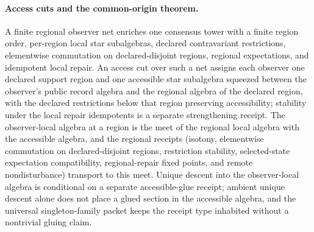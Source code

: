 \documentclass[11pt]{article}
\theoremstyle{remark}
\theoremstyle{plain}
\begin{document}
\paragraph{Access cuts and the common-origin theorem.}
A finite regional observer net enriches one consensus tower with a finite
region order, per-region local star subalgebras, declared contravariant
restrictions, elementwise commutation on declared-disjoint regions,
regional expectations, and idempotent local repair. An access cut over
such a net assigns each observer
one declared support region and one accessible star subalgebra squeezed
between the observer's public record algebra and the regional algebra of
the declared region, with the declared restrictions below that region
preserving accessibility; stability under the local repair idempotents is
a separate strengthening receipt. The observer-local algebra at a region
is the meet of the regional local algebra with the accessible algebra, and
the regional receipts (isotony, elementwise commutation on
declared-disjoint regions, restriction stability, selected-state
expectation compatibility, regional-repair fixed points, and remote
nondisturbance) transport to this meet. Unique descent into the
observer-local algebra is conditional on a separate accessible-glue
receipt; ambient unique descent alone does not place a glued section in
the accessible algebra, and the universal singleton-family packet keeps
the receipt type inhabited without a nontrivial gluing claim.
\end{document}
